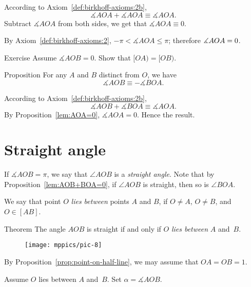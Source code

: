 According to Axiom~\ref{def:birkhoff-axioms:2b},
$$\measuredangle A O A
+
\measuredangle A O A 
\equiv
\measuredangle A O A.$$
Subtract  $\measuredangle A O A$ from both sides, we get that
$\measuredangle A O A \equiv 0$.

By Axiom~\ref{def:birkhoff-axioms:2}, $-\pi<\measuredangle A O A\le \pi$;
therefore $\measuredangle A O A \z= 0$.
\qeds

\begin{thm}{Exercise}\label{ex:2.4} 
Assume $\measuredangle A O B= 0$.
Show that $[OA)=[OB)$.
\end{thm}

\begin{thm}[\abs]{Proposition}\label{lem:AOB+BOA=0}
For any $A$ and $B$ distinct from $O$,
we have 
$$\measuredangle A O B\equiv-\measuredangle B O A.$$

\end{thm}

According to Axiom~\ref{def:birkhoff-axioms:2b},
$$\measuredangle A O B+\measuredangle B O A \equiv\measuredangle A O A.$$
By Proposition~\ref{lem:AOA=0}, $\measuredangle A O A=0$.
Hence the result.
\qeds

\section{Straight angle}

If $\measuredangle A O B=\pi$,
we say that $\angle A O B$ is a 
\emph{straight angle}.
Note that by Proposition~\ref{lem:AOB+BOA=0}, 
if $\angle A O B$ is straight,
then so is $\angle B O A$.

We say that point $O$ \emph{lies between} points $A$ and $B$, 
if $O\not= A$, $O\not= B$, and $O\in[A B]$.

\begin{thm}[\abs]{Theorem}\label{thm:straight-angle}
The angle $A O B$ is straight 
if and only if $O$ 
\emph{lies between} $A$ and~$B$.
\end{thm}

\begin{wrapfigure}{r}{40mm}
\centering
\texttt{[image: mppics/pic-8]}
\end{wrapfigure}

By Proposition~\ref{prop:point-on-half-line},  we may assume that
$O A = O B = 1$.

Assume $O$  
lies between $A$ and~$B$.
Set  $\alpha=\measuredangle A O B$.

